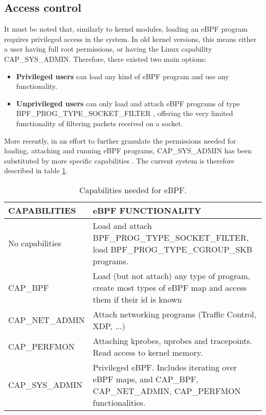 \subsection{Access control} \label{subsection:access_control}
It must be noted that, similarly to kernel modules, loading an eBPF program requires privileged access in the system. In old kernel versions, this means either a user having full root permissions, or having the Linux capability \cite{ubuntu_caps} CAP\_SYS\_ADMIN. Therefore, there existed two main options:
\begin{itemize}
\item \textbf{Privileged users} can load any kind of eBPF program and use any functionality.
\item \textbf{Unprivileged users} can only load and attach eBPF programs of type BPF\_PROG\_TYPE\_SOCKET\_FILTER \cite{evil_ebpf_p9}, offering the very limited functionality of filtering packets received on a socket.
\end{itemize}

More recently, in an effort to further granulate the permissions needed for loading, attaching and running eBPF programs, CAP\_SYS\_ADMIN has been substituted by more specific capabilities \cite{ebpf_caps_intro} \cite{ebpf_caps_lwn}. The current system is therefore described in table \ref{table:ebpf_caps_current}.

\begin{table}[htbp]
\begin{tabular}{|>{\centering\arraybackslash}p{4cm}|>{\centering\arraybackslash}p{10cm}|}
\hline
\textbf{CAPABILITIES} & \textbf{eBPF FUNCTIONALITY}\\
\hline
\hline
No capabilities & Load and attach BPF\_PROG\_TYPE\_SOCKET\_FILTER, load BPF\_PROG\_TYPE\_CGROUP\_SKB programs.\\
\hline
CAP\_BPF & Load (but not attach) any type of program, create most types of eBPF map and access them if their id is known\\
\hline
CAP\_NET\_ADMIN & Attach networking programs (Traffic Control, XDP, ...)\\
\hline
CAP\_PERFMON & Attaching kprobes, uprobes and tracepoints. Read access to kernel memory.\\
\hline
CAP\_SYS\_ADMIN & Privileged eBPF. Includes iterating over eBPF maps, and CAP\_BPF, CAP\_NET\_ADMIN, CAP\_PERFMON functionalities.\\
\hline
\end{tabular}
\caption{Capabilities needed for eBPF.}
\label{table:ebpf_caps_current}
\end{table}

